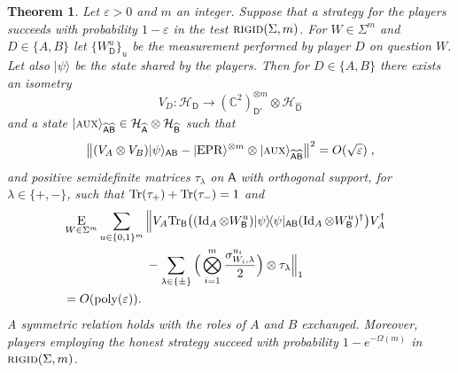 \documentclass[11pt]{article}
\newtheorem{theorem}{Theorem}
\newcommand{\ket}[1]{|#1\rangle}
\newcommand{\bra}[1]{\langle#1|}
\newcommand{\proj}[1]{\ket{#1}\!\bra{#1}}
\newcommand{\Tr}{\mbox{\rm Tr}}
\newcommand{\Id}{\ensuremath{\mathop{\rm Id}\nolimits}}
\DeclareMathOperator{\poly}{poly}
\newcommand{\reg}[1]{{\textsf{#1}}}
\newcommand{\C}{\ensuremath{\mathbb{C}}}
\newcommand{\mH}{\mathcal{H}}
\newcommand{\eps}{\varepsilon}
\newcommand{\EPR}{{\rm EPR}}
\newcommand{\aux}{\textsc {aux}}
\newcommand{\rigid}{\textsc{rigid}}
\begin{document}
\begin{theorem}\label{thm:clifford-rigid}
Let $\eps>0$ and $m$ an integer. Suppose that a strategy for the players succeeds with probability $1-\eps$ in the test $\rigid(\Sigma,m)$. 
For $W\in\Sigma^m$ and $D\in\{A,B\}$ let $\{W^u_\reg{D}\}_u$ be the measurement performed by player $D$ on question $W$. Let also $\ket{\psi}$ be the state shared by the players.
Then for $D\in\{A,B\}$ there exists an isometry 
$$V_D: \mathcal{H}_\reg{D} \to (\C^2)^{\otimes m}_{\reg{D}'} \otimes {\mH}_{\widehat{\reg{D}}}$$
and a state  $\ket{\aux}_{\widehat{\reg{A}}\widehat{\reg{B}}} \in {\mH}_{\widehat{\reg{A}}}\otimes {\mH}_{\widehat{\reg{B}}}$
such that
\begin{equation}
 \big\| (V_A \otimes V_B) \ket{\psi}_{\reg{AB}}  - \ket{\EPR}^{\otimes m} \otimes \ket{\aux}_{\widehat{\reg{A}}\widehat{\reg{B}}} \big\|^2 = O(\sqrt{\eps})\;,
\end{equation}
and positive semidefinite matrices $\tau_\lambda$ on $\widehat{\reg{A}}$ with orthogonal support, for $\lambda\in\{+,-\}$, such that $\Tr(\tau_+)+\Tr(\tau_-)=1$ and
\begin{align}
  &\mathop{\textsc{E}}_{W\in\Sigma^m} \sum_{u\in\{0,1\}^{m}} \Big\|V_A
  \Tr_{\reg{B}}\big((\Id_A \otimes W_{\reg{B}}^u) \proj{\psi}_{\reg{AB}} (\Id_A
  \otimes W_{\reg{B}}^u)^\dagger\big) V_A^\dagger \notag\\
  &\;\;\;\;\;\;\;\;\;\;\;\;\;\;\;\;\;\;\;\;\;\;\;\;- \sum_{\lambda\in\{\pm\}} \Big( \bigotimes_{i=1}^m \frac{\sigma_{W_{i},\lambda}^{u_{i}}}{2}\Big)\otimes \tau_\lambda  \Big\|_1\notag\\
  &= O(\poly(\eps)).&\label{eq:rigid-4}
\end{align}
A symmetric relation holds with the roles of $A$ and $B$ exchanged. 
Moreover, players employing the honest strategy succeed with probability $1-e^{-\Omega(m)}$ in $\rigid(\Sigma,m)$.  
\end{theorem}
\end{document}
